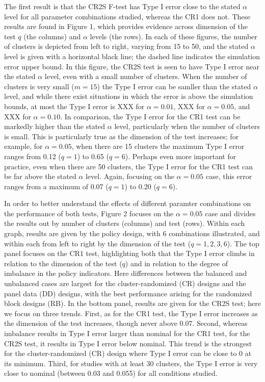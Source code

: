 \documentclass[12pt]{article}\usepackage[]{graphicx}\usepackage[]{color}
\begin{document}
The first result is that the CR2S F-test has Type I error close to the stated $\alpha$ level for all parameter combinations studied, whereas the CR1 does not. 
These results are found in Figure 1, which provides evidence across dimension of the test $q$ (the columns) and $\alpha$ levels (the rows). 
In each of these figures, the number of clusters is depicted from left to right, varying from 15 to 50, and the stated $\alpha$ level is given with a horizontal black line; the dashed line indicates the simulation error upper bound.
In this figure, the CR2S test is seen to have Type I error near the stated $\alpha$ level, even with a small number of clusters.
When the number of clusters is very small ($m = 15$) the Type I error can be samller than the stated $\alpha$ level, and while there exist situations in which the error is above the simulation bounds, at most the Type I error is XXX for $\alpha = 0.01$, XXX for $\alpha = 0.05$, and XXX for $\alpha = 0.10$.
In comparison, the Type I error for the CR1 test can be markedly higher than the stated $\alpha$ level, particularly when the number of clusters is small. 
This is particularly true as the dimension of the test increases; for example, for $\alpha = 0.05$, when there are 15 clusters the maximum Type I error ranges from 0.12 ($q = 1$) to 0.65 ($q = 6$).
Perhaps even more important for practice, even when there are 50 clusters, the Type I error for the CR1 test can be far above the stated $\alpha$ level.
Again, focusing on the $\alpha = 0.05$ case, this error ranges from a maximum of 0.07 ($q = 1$) to 0.20 ($q = 6$). 

In order to better understand the effects of different paramter combinations on the performance of both tests, Figure 2 focuses on the $\alpha = 0.05$ case and divides the results out by number of clusters (columns) and test (rows).
Within each graph, results are given by the policy design, with 6 combinations illustrated, and within each from left to right by the dimension of the test ($q = 1,2,3,6$).
The top panel focuses on the CR1 test, highlighting both that the Type I error climbs in relation to the dimension of the test ($q$) and in relation to the degree of imbalance in the policy indicators.
Here differences between the balanced and unbalanced cases are largest for the cluster-randomized (CR) designs and the panel data (DD) designs, with the best performance arising for the randomized block designs (RB).
In the bottom panel, results are given for the CR2S test; here we focus on three trends.
First, as for the CR1 test, the Type I error increases as the dimension of the test increases, though never above 0.07.
Second, whereas imbalance results in Type I error larger than nominal for the CR1 test, for the CR2S test, it results in Type I error below nominal. 
This trend is the strongest for the cluster-randomized (CR) design where Type I error can be close to 0 at its minimum. 
Third, for studies with at least 30 clusters, the Type I error is very close to nominal (between 0.03 and 0.055) for all conditions studied.
\end{document}
